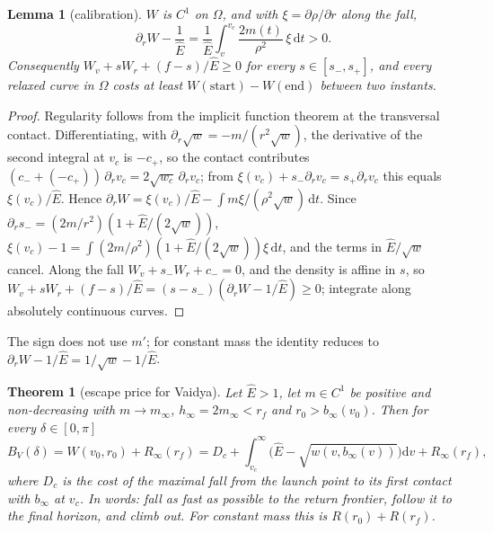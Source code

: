 \documentclass[aip,jmp,amsmath,amssymb,reprint]{revtex4-2}
\newcommand{\Ehat}{\hat E}
\newcommand{\dd}{\mathrm{d}}
\theoremstyle{plain}
\newtheorem{theorem}{Theorem}
\newtheorem{lemma}[proposition]{Lemma}
\theoremstyle{definition}
\begin{document}
\begin{lemma}[calibration]\label{lem:vaidya-calib}
$W$ is $C^1$ on $\Omega$, and with $\xi=\partial\rho/\partial r$ along the fall,
\[
  \partial_rW-\frac1\Ehat=\frac1\Ehat\int_v^{v_c}\frac{2m(t)}{\rho^2}\,\xi\,\dd t>0 .
\]
Consequently $W_v+sW_r+(f-s)/\Ehat\ge0$ for every $s\in[s_-,s_+]$, and every relaxed curve in $\Omega$
costs at least $W(\text{start})-W(\text{end})$ between two instants.
\end{lemma}

\begin{proof}
Regularity follows from the implicit function theorem at the transversal contact. Differentiating,
with $\partial_r\sqrt w=-m/(r^2\sqrt w)$, the derivative of the second integral at $v_c$ is $-c_+$, so the
contact contributes $(c_-+(-c_+))\,\partial_rv_c=2\sqrt{w_c}\,\partial_rv_c$; from
$\xi(v_c)+s_-\partial_rv_c=s_+\partial_rv_c$ this equals $\xi(v_c)/\Ehat$. Hence
$\partial_rW=\xi(v_c)/\Ehat-\int m\xi/(\rho^2\sqrt w)\,\dd t$. Since $\partial_rs_-=(2m/r^2)(1+\Ehat/(2\sqrt w))$,
$\xi(v_c)-1=\int(2m/\rho^2)(1+\Ehat/(2\sqrt w))\xi\,\dd t$, and the terms in $\Ehat/\sqrt w$ cancel. Along the
fall $W_v+s_-W_r+c_-=0$, and the density is affine in $s$, so
$W_v+sW_r+(f-s)/\Ehat=(s-s_-)(\partial_rW-1/\Ehat)\ge0$; integrate along absolutely continuous curves.
\end{proof}

The sign does not use $m'$; for constant mass the identity reduces to
$\partial_rW-1/\Ehat=1/\sqrt w-1/\Ehat$.

\begin{theorem}[escape price for Vaidya]\label{thm:vaidya-escape}
Let $\Ehat>1$, let $m\in C^1$ be positive and non-decreasing with $m\to m_\infty$, $h_\infty=2m_\infty<r_f$
and $r_0>b_\infty(v_0)$. Then for every $\delta\in[0,\pi]$
\[
  B_V(\delta)=W(v_0,r_0)+R_\infty(r_f)
  =D_c+\int_{v_c}^\infty\big(\Ehat-\sqrt{w(v,b_\infty(v))}\big)\dd v+R_\infty(r_f),
\]
where $D_c$ is the cost of the maximal fall from the launch point to its first contact with
$b_\infty$ at $v_c$. In words: fall as fast as possible to the return frontier, follow it to
the final horizon, and climb out. For constant mass this is $R(r_0)+R(r_f)$.
\end{theorem}
\end{document}
